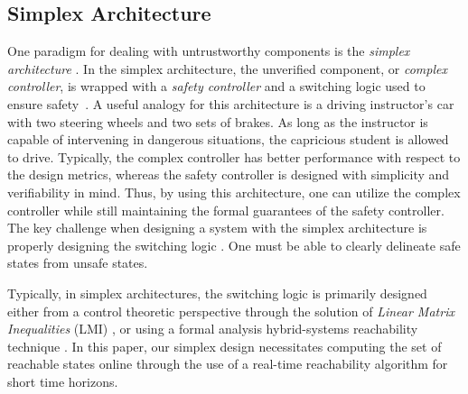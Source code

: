 \documentclass[manuscript,screen,review]{acmart}
\begin{document}
\subsection{Simplex Architecture}


One paradigm for dealing with untrustworthy components is the \emph{simplex architecture} \cite{RiveraAnArchitectural1996}. In the simplex architecture, the unverified component, or \emph{complex controller}, is wrapped with a \emph{safety controller} and a switching logic used to ensure safety~\cite{Bak2014}. A useful analogy for this architecture is a driving instructor's car with two steering wheels and two sets of brakes. As long as the instructor is capable of intervening in dangerous situations, the capricious student is allowed to drive. Typically, the complex controller has better performance with respect to the design metrics, whereas the safety controller is designed with simplicity and verifiability in mind. Thus, by using this architecture, one can utilize the complex controller while still maintaining the formal guarantees of the safety controller. The key challenge when designing a system with the simplex architecture is properly designing the switching logic \cite{Johnson2016}. One must be able to clearly delineate safe states from unsafe states. 

Typically, in simplex architectures, the switching logic is primarily designed either from a control theoretic perspective through the solution of \emph{Linear Matrix Inequalities} (LMI) \cite{SetoCaseStudy2000}, or using a formal analysis hybrid-systems reachability technique \cite{Bak2009Simplex}. In this paper, our simplex design necessitates computing the set of reachable states online through the use of a real-time reachability algorithm for short time horizons.
\end{document}
